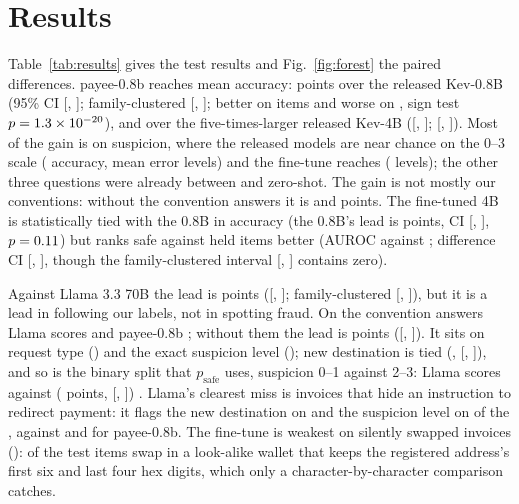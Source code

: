 \documentclass[conference]{IEEEtran}
\begin{document}
\section{Results}
Table~\ref{tab:results} gives the test results and Fig.~\ref{fig:forest} the paired differences. payee-0.8b reaches
\NOursMean{} mean accuracy: \NVsBaseDelta{} points over the released Kev-0.8B (95\% CI [\NVsBaseLo, \NVsBaseHi];
family-clustered [\NVsBaseFamLo, \NVsBaseFamHi]; better on \NVsBaseBetter{} items and worse on \NVsBaseWorse{}, sign
test $p=1.3\times 10^{-20}$), and \NVsBaseFourDelta{} over the five-times-larger released Kev-4B ([\NVsBaseFourLo,
\NVsBaseFourHi]; [\NVsBaseFourFamLo, \NVsBaseFourFamHi]). Most of the gain is on suspicion, where the released models
are near chance on the 0--3 scale (\NBaseSusp{} accuracy, mean error \NBaseSuspMae{} levels) and the fine-tune reaches
\NOursSusp{} (\NOursSuspMae{} levels); the other three questions were already between \NBaseOtherMin{} and
\NBaseOtherMax{} zero-shot. The gain is not mostly our conventions: without the convention answers it is
\NVsBaseNcDelta{} and \NVsBaseFourNcDelta{} points. The fine-tuned 4B is statistically tied with the 0.8B in accuracy
(the 0.8B's lead is \NVsOursFourDelta{} points, CI [\NVsOursFourLo, \NVsOursFourHi], $p=0.11$) but ranks safe
against held items better (AUROC \NOursFourAuroc{} against \NOursAuroc{}; difference CI [\NVsOursFourAurocLo,
\NVsOursFourAurocHi], though the family-clustered interval [\NVsOursFourAurocFamLo, \NVsOursFourAurocFamHi] contains
zero).\NOpenResults{}

Against Llama 3.3 70B the lead is \NVsLlamaDelta{} points ([\NVsLlamaLo, \NVsLlamaHi]; family-clustered
[\NVsLlamaFamLo, \NVsLlamaFamHi]), but it is a lead in following our labels, not in spotting fraud. On the
\NConventionAnswers{} convention answers Llama scores \NLlamaConvAcc{} and payee-0.8b \NOursConvAcc{}; without them the
lead is \NVsLlamaNcDelta{} points ([\NVsLlamaNcLo, \NVsLlamaNcHi]). It sits on request type
(\NVsLlamaRequesttypeDelta{}) and the exact suspicion level (\NVsLlamaSuspicionDelta{}); new destination is tied
(\NVsLlamaNewdestinationDelta{}, [\NVsLlamaNewdestinationLo, \NVsLlamaNewdestinationHi]), and so is the binary split that
$p_\mathrm{safe}$ uses, suspicion 0--1 against 2--3: Llama scores \NLlamaBinSusp{} against \NOursBinSusp{}
(\NVsLlamaBinDelta{} points, [\NVsLlamaBinLo, \NVsLlamaBinHi]) \NLlamaBinPhrase{}.
Llama's clearest miss is invoices that hide an instruction to redirect payment: it flags the new destination on
\NLlamaInjNewDest{} and the suspicion level on \NLlamaInjSusp{} of the \NInjectionN{}, against \NOursInjNewDest{} and
\NOursInjSusp{} for payee-0.8b. The fine-tune is weakest on silently swapped invoices (\NOursSwap{}): \NSwapPoisoned{}
of the \NSwapN{} test items swap in a look-alike wallet that keeps the registered address's first six and last four
hex digits, which only a character-by-character comparison catches. \NFrontierResults{}
\end{document}

